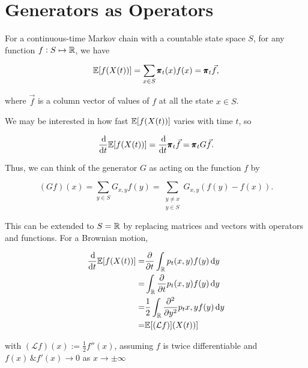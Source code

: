 \section{Generators as Operators}

For a continuous-time Markov chain with a countable state space $S$, for any function $f: S \mapsto \mathbb{R}$, we have 

\begin{equation*}
    \mathbb{E} [f(X(t))] = \sum_{x \in S} \pmb{\pi}_t(x) f(x) = \pmb{\pi}_t \vec{f},
\end{equation*}

where $\vec{f}$ is a column vector of values of $f$ at all the state $x \in S$.

We may be interested in how fast $\mathbb{E} [f(X(t))]$ varies with time $t$, so 

\begin{equation*}
    \frac{\dif}{\dif t} \E [f(X(t))] = \frac{\dif}{\dif t}\mbf{\pi}_t \vec{f} = \mbf{\pi}_t G \vec{f}.
\end{equation*}

Thus, we can think of the generator $G$ as acting on the function $f$ by 

\begin{equation*}
    (Gf) (x) = \sum_{y \in S} G_{x, y} f(y) = \sum_{\substack{y \neq x \\ y \in S}} G_{x, y} (f(y) - f(x)).
\end{equation*}

This can be extended to $S = \mathbb{R}$ by replacing matrices and vectors with operators and functions. For a Brownian motion,

\begin{align*}
    \frac{\dif}{\dif t} \E [f(X(t))] = & \frac{\partial}{\partial t} \int_\mbb{R} p_t(x, y) f(y) \dif y \\ 
    = & \int_\mbb{R} \frac{\partial}{\partial t} p_t(x, y) f(y) \dif y \\ 
    = & \frac{1}{2} \int_\mbb{R} \frac{\partial^2}{\partial y^2} p_t{x, y} f(y) \dif y \\ 
    = & \E [(\mathcal{L}f)](X(t))]
\end{align*}

with $(\mathcal{L}f)(x) := \frac{1}{2} f''(x)$, assuming $f$ is twice differentiable and $f(x) \, \& f'(x) \to 0$ as $x \to \pm \infty$